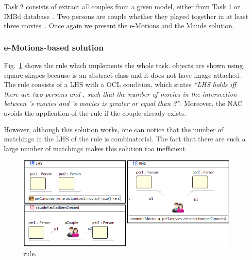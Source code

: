 
Task 2 consists of extract all couples from a given model, either from Task 1 or IMBd database~\cite{imdbsources}. Two persons are couple whether they played together in at least three movies~\cite{imdbcase}. Once again we present the e-Motions and the Maude solution.

\subsubsection{e-Motions-based solution}

Fig.~\ref{fig:createCouple} shows the  rule which implements the whole task.  objects are shown using square shapes because  is an abstract class and it does not have image attached. The  rule consists of a LHS with a OCL condition, which states \textit{``LHS holds iff there are two persons  and , such that the number of movies in the intersection between 's movies and 's movies is greater or equal than 3''}. Moreover, the  NAC avoids the application of the rule if the couple already exists. 

However, although this solution works, one can notice that the number of matchings in the LHS of the rule is combinatorial. The fact that there are such a large number of matchings makes this solution too inefficient. 


\begin{figure}[htp]
  \centering
  \includegraphics[width=\textwidth]{imgs/ruleCouples}
  \caption{ rule.}\label{fig:createCouple}
\end{figure}

